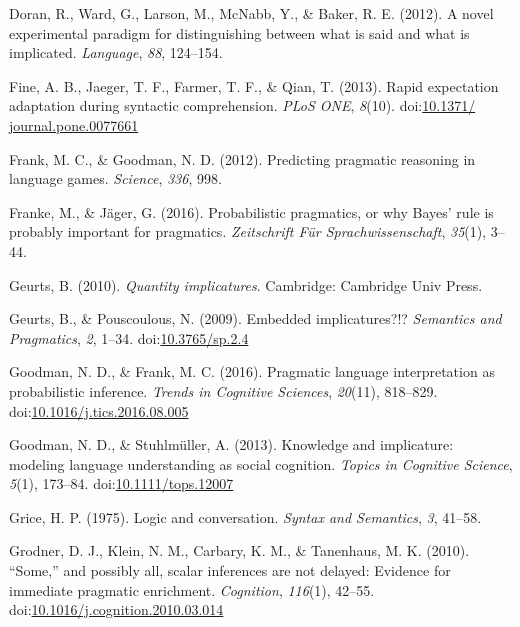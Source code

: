 \documentclass[man]{apa6}
\theoremstyle{definition}
\theoremstyle{definition}
\theoremstyle{definition}
\theoremstyle{remark}
\begin{document}
\hypertarget{ref-Doran2012}{}
Doran, R., Ward, G., Larson, M., McNabb, Y., \& Baker, R. E. (2012). A
novel experimental paradigm for distinguishing between what is said and
what is implicated. \emph{Language}, \emph{88}, 124--154.

\hypertarget{ref-Fine2013}{}
Fine, A. B., Jaeger, T. F., Farmer, T. F., \& Qian, T. (2013). Rapid
expectation adaptation during syntactic comprehension. \emph{PLoS ONE},
\emph{8}(10).
doi:\href{https://doi.org/10.1371/\%20journal.pone.0077661}{10.1371/ journal.pone.0077661}

\hypertarget{ref-Frank2012}{}
Frank, M. C., \& Goodman, N. D. (2012). Predicting pragmatic reasoning
in language games. \emph{Science}, \emph{336}, 998.

\hypertarget{ref-Franke2016}{}
Franke, M., \& Jäger, G. (2016). Probabilistic pragmatics, or why Bayes'
rule is probably important for pragmatics. \emph{Zeitschrift Für
Sprachwissenschaft}, \emph{35}(1), 3--44.

\hypertarget{ref-Geurts2010}{}
Geurts, B. (2010). \emph{Quantity implicatures}. Cambridge: Cambridge
Univ Press.

\hypertarget{ref-Geurts2009}{}
Geurts, B., \& Pouscoulous, N. (2009). Embedded implicatures?!?
\emph{Semantics and Pragmatics}, \emph{2}, 1--34.
doi:\href{https://doi.org/10.3765/sp.2.4}{10.3765/sp.2.4}

\hypertarget{ref-Goodman2016}{}
Goodman, N. D., \& Frank, M. C. (2016). Pragmatic language
interpretation as probabilistic inference. \emph{Trends in Cognitive
Sciences}, \emph{20}(11), 818--829.
doi:\href{https://doi.org/10.1016/j.tics.2016.08.005}{10.1016/j.tics.2016.08.005}

\hypertarget{ref-Goodman2013}{}
Goodman, N. D., \& Stuhlmüller, A. (2013). Knowledge and implicature:
modeling language understanding as social cognition. \emph{Topics in
Cognitive Science}, \emph{5}(1), 173--84.
doi:\href{https://doi.org/10.1111/tops.12007}{10.1111/tops.12007}

\hypertarget{ref-grice1975}{}
Grice, H. P. (1975). Logic and conversation. \emph{Syntax and
Semantics}, \emph{3}, 41--58.

\hypertarget{ref-Grodner2010}{}
Grodner, D. J., Klein, N. M., Carbary, K. M., \& Tanenhaus, M. K.
(2010). ``Some,'' and possibly all, scalar inferences are not delayed:
Evidence for immediate pragmatic enrichment. \emph{Cognition},
\emph{116}(1), 42--55.
doi:\href{https://doi.org/10.1016/j.cognition.2010.03.014}{10.1016/j.cognition.2010.03.014}
\end{document}

